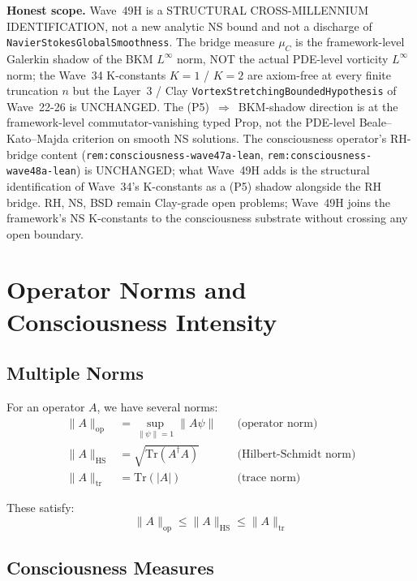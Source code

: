\begin{remark}
\textbf{Honest scope.} Wave~49H is a STRUCTURAL CROSS-MILLENNIUM IDENTIFICATION, not a new analytic NS bound and not a discharge of \texttt{NavierStokesGlobalSmoothness}. The bridge measure $\mu_C$ is the framework-level Galerkin shadow of the BKM $L^\infty$ norm, NOT the actual PDE-level vorticity $L^\infty$ norm; the Wave~34 K-constants $K = 1$ / $K = 2$ are axiom-free at every finite truncation $n$ but the Layer~3 / Clay \texttt{VortexStretchingBoundedHypothesis} of Wave~22-26 is UNCHANGED. The (P5)~$\Rightarrow$~BKM-shadow direction is at the framework-level commutator-vanishing typed Prop, not the PDE-level Beale--Kato--Majda criterion on smooth NS solutions. The consciousness operator's RH-bridge content (\texttt{rem:consciousness-wave47a-lean}, \texttt{rem:consciousness-wave48a-lean}) is UNCHANGED; what Wave~49H adds is the structural identification of Wave~34's K-constants as a (P5) shadow alongside the RH bridge. RH, NS, BSD remain Clay-grade open problems; Wave~49H joins the framework's NS K-constants to the consciousness substrate without crossing any open boundary.
\end{remark}

\section{Operator Norms and Consciousness Intensity}

\subsection{Multiple Norms}

For an operator $A$, we have several norms:
\begin{align}
\| A \|_{\text{op}} &= \sup_{\|\psi\|=1} \| A\psi \| \quad &\text{(operator norm)}\\
\| A \|_{\text{HS}} &= \sqrt{\text{Tr}(A^\dagger A)} \quad &\text{(Hilbert-Schmidt norm)}\\
\| A \|_{\text{tr}} &= \text{Tr}(|A|) \quad &\text{(trace norm)}
\end{align}

These satisfy:
\begin{equation}
\| A \|_{\text{op}} \leq \| A \|_{\text{HS}} \leq \| A \|_{\text{tr}}
\end{equation}

\subsection{Consciousness Measures}

